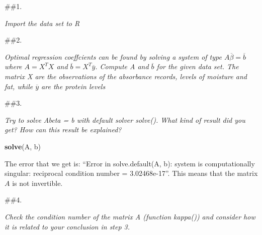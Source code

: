 \documentclass[]{article}
\newenvironment{Shaded}{\begin{snugshade}}{\end{snugshade}}
\newcommand{\KeywordTok}[1]{\textcolor[rgb]{0.13,0.29,0.53}{\textbf{#1}}}
\newcommand{\NormalTok}[1]{#1}
\newcommand{\OperatorTok}[1]{\textcolor[rgb]{0.81,0.36,0.00}{\textbf{#1}}}
\newcommand{\StringTok}[1]{\textcolor[rgb]{0.31,0.60,0.02}{#1}}
\begin{document}
\#\#1.

\emph{Import the data set to R}

\begin{Shaded}
\end{Shaded}

\#\#2.

\emph{Optimal regression coeffcients can be found by solving a system of
type \(A\overline{\beta} = \overline{b}\) where \(A=X^TX\) and
\(\overline{b} = X^T\overline{y}\). Compute A and \(\overline{b}\) for
the given data set. The matrix X are the observations of the absorbance
records, levels of moisture and fat, while \(\overline{y}\) are the
protein levels}

\begin{Shaded}
\end{Shaded}

\#\#3.

\emph{Try to solve Abeta = b with default solver solve(). What kind of
result did you get? How can this result be explained?}

\begin{Shaded}
\begin{Highlighting}[]
\KeywordTok{solve}\NormalTok{(A, b)}
\end{Highlighting}
\end{Shaded}

The error that we get is: ``Error in solve.default(A, b): system is
computationally singular: reciprocal condition number = 3.02468e-17''.
This means that the matrix \(A\) is not invertible.

\#\#4.

\emph{Check the condition number of the matrix A (function kappa()) and
consider how it is related to your conclusion in step 3.}
\end{document}
